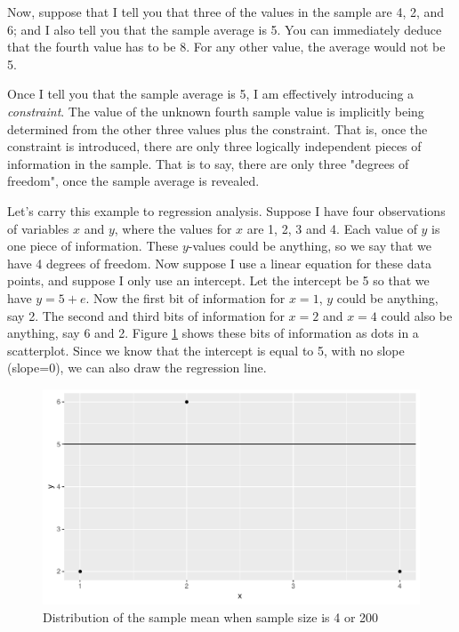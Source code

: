 \documentclass[]{book}\usepackage[]{graphicx}\usepackage[]{color}
\makeatletter
\def\maxwidth{ %
  \ifdim\Gin@nat@width>\linewidth
    \linewidth
  \else
    \Gin@nat@width
  \fi
}
\newenvironment{knitrout}{}{} %
\makeatother
\begin{document}
Now, suppose that I tell you that three of the values in the sample are 4, 2, and 6; and I also tell you that the sample average is 5. You can immediately deduce that the fourth value has to be 8. For any other value, the average would not be 5. 

Once I tell you that the sample average is 5, I am effectively introducing a \textit{constraint}. The value of the unknown fourth sample value is implicitly being determined from the other three values plus the constraint. That is, once the constraint is introduced, there are only three logically independent pieces of information in the sample. That is to say, there are only three "degrees of freedom", once the sample average is revealed.

Let's carry this example to regression analysis. Suppose I have four observations of variables $x$ and $y$, where the values for $x$ are 1, 2, 3 and 4. Each value of $y$ is one piece of information. These $y$-values could be anything, so we say that we have 4 degrees of freedom. Now suppose I use a linear equation for these data points, and suppose I only use an intercept. Let the intercept be 5 so that we have $y=5+e$. Now the first bit of information for $x=1$, $y$ could be anything, say 2. The second and third bits of information for $x=2$ and $x=4$ could also be anything, say 6 and 2. Figure \ref{fig:inf_11} shows these bits of information as dots in a scatterplot. Since we know that the intercept is equal to 5, with no slope (slope=0), we can also draw the regression line.

\begin{knitrout}
\color{fgcolor}\begin{figure}

{\centering \includegraphics[width=\maxwidth]{figure/inf_11-1} 

}

\caption[Distribution of the sample mean when sample size is 4 or 200]{Distribution of the sample mean when sample size is 4 or 200}\label{fig:inf_11}
\end{figure}


\end{knitrout}
\end{document}
